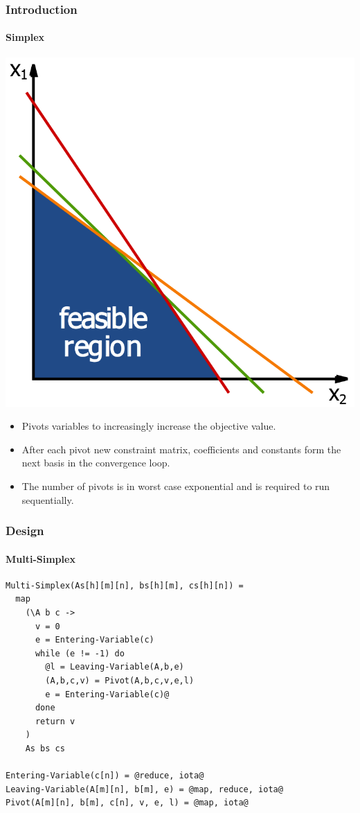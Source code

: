 \documentclass{beamer}
\begin{document}
\begin{frame}[fragile]
\frametitle{Introduction}
\framesubtitle{Simplex}
\centering
\includegraphics[height=0.4\textheight]{../Doc/figures/Linear_Programming_Feasible_Region}
\begin{itemize}
\item Pivots variables to increasingly increase the objective value.
\item After each pivot new constraint matrix, coefficients and constants form the next basis in the convergence loop.
\item The number of pivots is in worst case exponential and is required to run sequentially.
\end{itemize}
\end{frame}


\begin{frame}[fragile]
\frametitle{Design}
\framesubtitle{Multi-Simplex}
\begin{lstlisting}
Multi-Simplex(As[h][m][n], bs[h][m], cs[h][n]) =
  map
    (\A b c ->
      v = 0
      e = Entering-Variable(c)
      while (e != -1) do
        @l = Leaving-Variable(A,b,e)
        (A,b,c,v) = Pivot(A,b,c,v,e,l)
        e = Entering-Variable(c)@
      done
      return v
    )
    As bs cs

Entering-Variable(c[n]) = @reduce, iota@
Leaving-Variable(A[m][n], b[m], e) = @map, reduce, iota@
Pivot(A[m][n], b[m], c[n], v, e, l) = @map, iota@
\end{lstlisting}
\end{frame}
\end{document}

